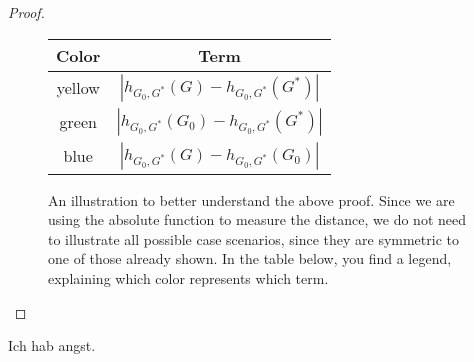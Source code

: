 \begin{proof}
\begin{enumerate}
        \begin{figure}[H]
            \centering
            \begin{subfigure}{0.45\textwidth}
                \centering
                        
            \end{subfigure}
            \begin{subfigure}{0.45\textwidth}
                \centering
                        
            \end{subfigure}
            \caption{An illustration to better understand the above proof. Since we are using the absolute function to measure the distance, we do not need to illustrate all possible case scenarios, since they are symmetric to one of those already shown. In the table below, you find a legend, explaining which color represents which term.}
            \begin{tabular}{ c | c }
                Color & Term \\
                \hline
                yellow  & $|h_{G_0, G^*}(G) - h_{G_0, G^*}(G^*)|$\\
                green & $|h_{G_0, G^*}(G_0) - h_{G_0, G^*}(G^*)|$\\ 
                blue & $|h_{G_0, G^*}(G) - h_{G_0, G^*}(G_0)|$\\
            \end{tabular}
            \label{fig:proof_support}
        \end{figure}
    \end{enumerate}

\end{proof}

\begin{lemma}
    Ich hab angst.
\end{lemma}

